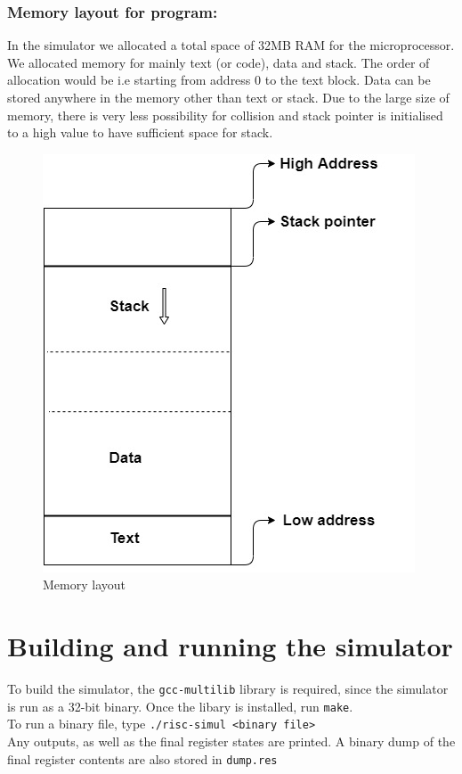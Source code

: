 \subsubsection{Memory layout for program:}
In the simulator we allocated a total space of 32MB RAM for the microprocessor. We allocated memory for mainly text (or code), data and stack. The order of allocation would be i.e starting from address 0 to the text block. Data can be stored anywhere in the memory other than text or stack. Due to the large size of memory, there is very less possibility for collision and stack pointer is initialised to a high value to have sufficient space for stack.
\begin{figure}[H]
    \centering
    \includegraphics[scale=0.7]{figures/mem.jpg}
    \caption{Memory layout}
    \label{fig:Memory layout}
\end{figure}

\section{Building and running the simulator}
\newline To build the simulator, the \texttt{gcc-multilib} library is required, since the simulator is run as a 32-bit binary. Once the libary is installed, run \texttt{make}.\\
To run a binary file, type \texttt{./risc-simul <binary file>}\\
Any outputs, as well as the final register states are printed. A binary dump of the final register contents are also stored in \texttt{dump.res}






